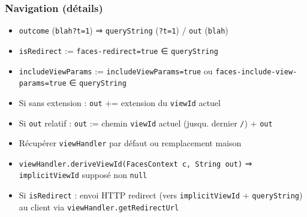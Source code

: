 \documentclass[english, french]{beamer}
\begin{document}
\begin{frame}
	\frametitle{Navigation (détails)}
	\begin{itemize}
		\item \texttt{outcome} (\texttt{blah?t=1}) ⇒ \texttt{queryString} (\texttt{?t=1}) / \texttt{out} (\texttt{blah})
		\item \texttt{isRedirect} := \texttt{faces-redirect=true} ∈ \texttt{queryString}
		\item \texttt{includeViewParams} := \texttt{includeViewParams=true} {\tiny ou \texttt{faces-include-view-params=true}} ∈ \texttt{queryString} %
		\item Si sans extension : \texttt{out} += extension du \texttt{viewId} actuel
		\item Si \texttt{out} relatif : \texttt{out} := chemin \texttt{viewId} actuel {\tiny (jusqu. dernier \texttt{/})} + \texttt{out}
		\item Récupérer \texttt{viewHandler} par défaut {\tiny ou remplacement maison}
		\item \texttt{viewHandler.deriveViewId(FacesContext c, String out)} ⇒ \texttt{implicitViewId} {\tiny supposé non \texttt{null}}
		\item Si \texttt{isRedirect} : envoi HTTP redirect {\tiny (vers \texttt{implicitViewId} + \texttt{queryString})} au client {\tiny via \texttt{viewHandler.getRedirectUrl%
}}
\end{itemize}
\end{frame}
\end{document}
